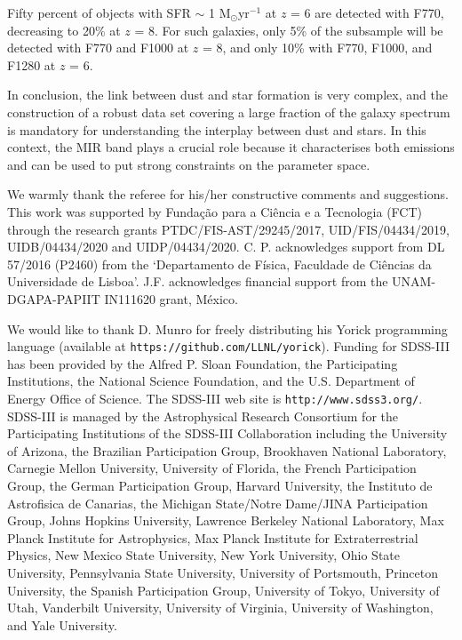 \documentclass{aa}
\begin{document}
Fifty percent of objects with SFR $\sim$ 1 M$_\odot$yr$^{-1}$ at $z$ = 6 are detected with F770, decreasing to 20\% at $z$ = 8. For such galaxies, only 5\% of the subsample will be detected with F770 and F1000 at $z$ = 8, and only 10\% with F770, F1000, and F1280 at $z$ = 6.

In conclusion, the link between dust and star formation is very complex, and the construction of a robust data set covering a large fraction of the galaxy spectrum is mandatory for understanding the interplay between dust and stars. In this context, the MIR band plays a crucial role because it characterises both emissions and can be used to put strong constraints on the parameter space.

\begin{acknowledgements}
We warmly thank the referee for his/her constructive comments and suggestions. 
This work was supported by Fundação para a Ci\^{e}ncia e a Tecnologia (FCT) through the research grants PTDC/FIS-AST/29245/2017, UID/FIS/04434/2019, UIDB/04434/2020 and UIDP/04434/2020. C. P. acknowledges support from DL 57/2016 (P2460) from the `Departamento de F\'{i}sica, Faculdade de Ci\^{e}ncias da Universidade de Lisboa'. J.F. acknowledges financial support from the UNAM- DGAPA-PAPIIT IN111620 grant, M\'exico.

We would like to thank D. Munro for freely distributing his Yorick programming language (available at \texttt{https://github.com/LLNL/yorick}). Funding for SDSS-III has been provided by the Alfred P. Sloan Foundation, the Participating Institutions, the National Science Foundation, and the U.S. Department of Energy Office of Science. The SDSS-III web site is \texttt{http://www.sdss3.org/}. SDSS-III is managed by the Astrophysical Research Consortium for the Participating Institutions of the SDSS-III Collaboration including the University of Arizona, the Brazilian Participation Group, Brookhaven National Laboratory, Carnegie Mellon University, University of Florida, the French Participation Group, the German Participation Group, Harvard University, the Instituto de Astrofisica de Canarias, the Michigan State/Notre Dame/JINA Participation Group, Johns Hopkins University, Lawrence Berkeley National Laboratory, Max Planck Institute for Astrophysics, Max Planck Institute for Extraterrestrial Physics, New Mexico State University, New York University, Ohio State University, Pennsylvania State University, University of Portsmouth, Princeton University, the Spanish Participation Group, University of Tokyo, University of Utah, Vanderbilt University, University of Virginia, University of Washington, and Yale University. 

\end{acknowledgements}
\end{document}

